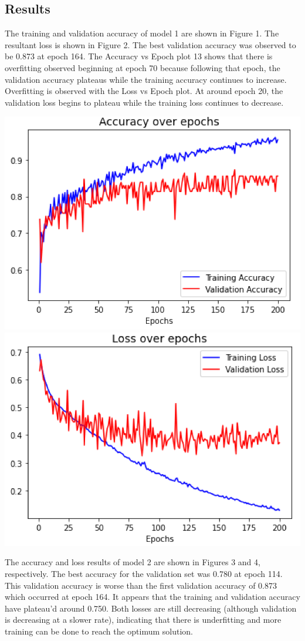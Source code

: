 \documentclass[10pt]{article}
\begin{document}
\begin{multicols}{2}
\section{Results}
The training and validation accuracy of model 1 are shown in Figure 1. The resultant loss is shown in Figure 2. The best validation accuracy was observed to be 0.873 at epoch 164. The Accuracy vs Epoch plot 13 shows that there is overfitting observed beginning at epoch 70 because following that epoch, the validation accuracy plateaus while the training accuracy continues to increase. Overfitting is observed with the Loss vs Epoch plot. At around epoch 20, the validation loss begins to plateau while the training loss continues to decrease.

\begin{center}
\includegraphics[width=.4\textwidth]{Model1Acc}
\includegraphics[width=.4\textwidth]{Model1Loss}
\end{center}

The accuracy and loss results of model 2 are shown in Figures 3 and 4, respectively. The best accuracy for the validation set was 0.780 at epoch 114. This validation accuracy is worse than the first validation accuracy of 0.873 which occurred at epoch 164. It appears that the training and validation accuracy have plateau'd around 0.750. Both losses are still decreasing (although validation is decreasing at a slower rate), indicating that there is underfitting and more training can be done to reach the optimum solution.


\end{multicols}
\end{document}
